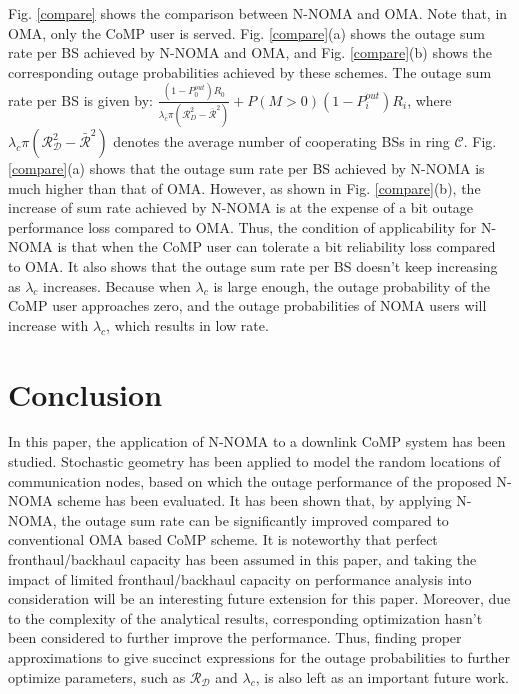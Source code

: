 \documentclass[10pt, doublecolumn]{IEEEtran}
\begin{document}
{\color{black}Fig. \ref{compare} shows the comparison between N-NOMA and OMA. Note that, in OMA, only the CoMP user is served. Fig. \ref{compare}(a) shows the outage sum rate per BS achieved by N-NOMA and OMA, and Fig. \ref{compare}(b) shows the corresponding outage probabilities
achieved by these schemes. The outage sum rate per BS is given by:
$\frac{(1-P_0^{out})R_0}{\lambda_c\pi(\mathcal{R}_D^2-\bar{\mathcal{R}}^2)}+P(M>0)(1-P_i^{out})R_i$, where
$\lambda_c\pi(\mathcal{R}_{\mathcal{D}}^2-\bar{\mathcal{R}}^2)$ denotes the average number of cooperating BSs in ring $\mathcal{C}$. Fig. \ref{compare}(a) shows that the outage sum rate per BS achieved by N-NOMA is much higher than that of OMA.
However, as shown in Fig. \ref{compare}(b), the increase of sum rate achieved by N-NOMA is at the expense of
a bit outage performance loss compared to OMA.
Thus, the condition of applicability for N-NOMA is that when the CoMP user can tolerate a bit reliability loss compared to OMA.
It also shows that the outage sum rate per BS doesn't keep increasing as $\lambda_c$ increases. Because when $\lambda_c$ is large enough, the outage probability of the CoMP user approaches zero, and the outage probabilities of NOMA users will increase with $\lambda_c$, which results in low rate.}
\section{Conclusion}
In this paper, the application of N-NOMA to a downlink CoMP system has been studied.
Stochastic geometry has been applied to model the random locations of communication nodes, based on which the outage performance of the proposed N-NOMA scheme has been evaluated. It has been shown that, by applying N-NOMA, the outage sum rate can be significantly improved compared to conventional OMA based CoMP scheme.
It is noteworthy that perfect fronthaul/backhaul capacity has been assumed in this paper, and taking the impact of limited fronthaul/backhaul capacity on performance analysis into consideration will be an interesting future extension for this paper. {\color{black}Moreover, due to the complexity of the analytical results, corresponding optimization hasn't been considered to further improve the performance. Thus, finding proper approximations to give succinct  expressions for the outage probabilities to further optimize parameters,  such as $\mathcal{R}_{\mathcal{D}}$ and $\lambda_c$, is also left as an important future work.}


\end{document}
